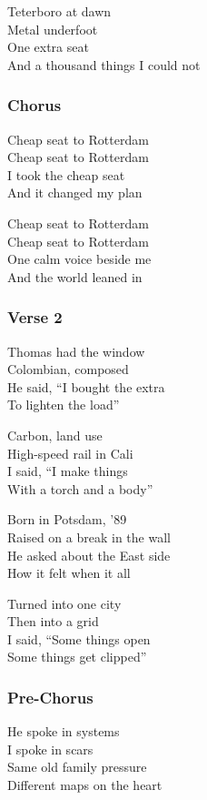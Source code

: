 Teterboro at dawn\\
Metal underfoot\\
One extra seat\\
And a thousand things I could not

\subsubsection{Chorus}\label{chorus-61}

Cheap seat to Rotterdam\\
Cheap seat to Rotterdam\\
I took the cheap seat\\
And it changed my plan

Cheap seat to Rotterdam\\
Cheap seat to Rotterdam\\
One calm voice beside me\\
And the world leaned in

\subsubsection{Verse 2}\label{verse-2-24}

Thomas had the window\\
Colombian, composed\\
He said, ``I bought the extra\\
To lighten the load''

Carbon, land use\\
High-speed rail in Cali\\
I said, ``I make things\\
With a torch and a body''

Born in Potsdam, '89\\
Raised on a break in the wall\\
He asked about the East side\\
How it felt when it all

Turned into one city\\
Then into a grid\\
I said, ``Some things open\\
Some things get clipped''

\subsubsection{Pre-Chorus}\label{pre-chorus-40}

He spoke in systems\\
I spoke in scars\\
Same old family pressure\\
Different maps on the heart

